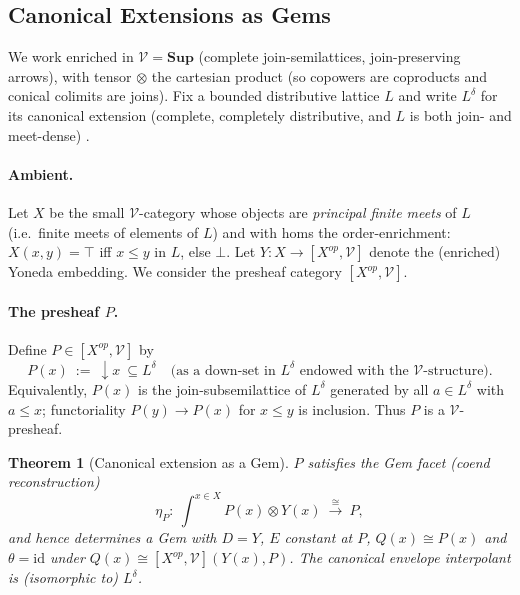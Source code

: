 \documentclass[11pt]{article}
\theoremstyle{plain}
\newtheorem{theorem}{Theorem}[section]
\theoremstyle{definition}
\theoremstyle{remark}
\newcommand{\V}{\mathcal{V}}
\begin{document}
\subsection{Canonical Extensions as Gems}\label{ssec:gem-canonical-extension}

We work enriched in $\V=\mathbf{Sup}$ (complete join-semilattices, join-preserving arrows), with tensor $\otimes$ the cartesian product (so copowers are coproducts and conical colimits are joins). Fix a bounded distributive lattice $L$ and write $L^\delta$ for its canonical extension (complete, completely distributive, and $L$ is both join- and meet-dense) \cite{jonsson1951boolean}.

\paragraph{Ambient.}
Let $X$ be the small $\V$-category whose objects are \emph{principal finite meets} of $L$ (i.e.\ finite meets of elements of $L$) and with homs the order-enrichment: $X(x,y)=\top$ iff $x\le y$ in $L$, else $\bot$. Let $Y:X\to [X^{op},\V]$ denote the (enriched) Yoneda embedding. We consider the presheaf category $[X^{op},\V]$.

\paragraph{The presheaf $P$.}
Define $P\in [X^{op},\V]$ by
$$
P(x) \ :=\ \downarrow x \ \subseteq L^\delta
\quad\text{(as a down-set in $L^\delta$ endowed with the $\V$-structure).}
$$
Equivalently, $P(x)$ is the join-subsemilattice of $L^\delta$ generated by all $a\in L^\delta$ with $a\le x$; functoriality $P(y)\to P(x)$ for $x\le y$ is inclusion. Thus $P$ is a $\V$-presheaf.

\begin{theorem}[Canonical extension as a Gem]
$P$ satisfies the Gem facet (coend reconstruction)
$$
\eta_P:\ \int^{x\in X} P(x)\otimes Y(x) \ \xrightarrow{\ \cong\ }\ P,
$$
and hence determines a Gem with $D=Y$, $E$ constant at $P$, $Q(x)\cong P(x)$ and $\theta=\mathrm{id}$ under $Q(x)\cong [X^{op},\V](Y(x),P)$.
The canonical envelope interpolant is (isomorphic to) $L^\delta$.
\end{theorem}
\end{document}
